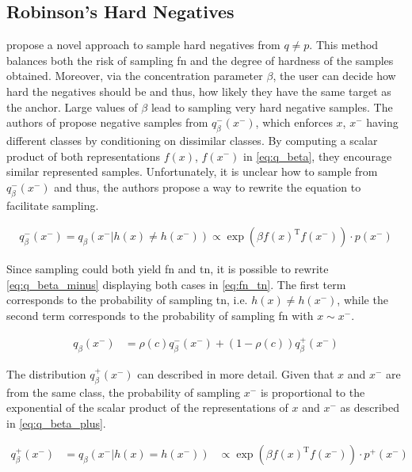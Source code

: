 \subsection{Robinson's Hard Negatives}\label{subsec:robinson_hard_negatives}

\citet{robinson_contrastive_2021} 
propose a novel approach to sample hard negatives from $q \neq p$.
This method balances both the risk of sampling \ac{fn} and the degree of hardness of the samples obtained.
Moreover, via the concentration parameter $\beta$, the user can decide how hard the negatives should be and thus, how likely they have the same target as the anchor.
Large values of $\beta$ lead to sampling very hard negative samples.
The authors of \citet{robinson_contrastive_2021} propose negative samples from $q^-_{\beta}(x^-)$, 
which enforces $x$, $x^-$ having different classes by conditioning on dissimilar classes.
By computing a scalar product of both representations $f(x)$, $f(x^-)$ in \eqref{eq:q_beta}, 
they encourage similar represented samples.
Unfortunately, it is unclear how to sample from $q^-_{\beta}(x^-)$ and thus, 
the authors propose a way to rewrite the equation to facilitate sampling.

\begin{align} 
    q^-_{\beta}(x^-) = q_\beta(x^-|h(x) \neq h(x^-)) \propto \exp(\beta f(x)^\text{T}f(x^-))\cdot p(x^-) 
\label{eq:q_beta}
\end{align} 


Since sampling could both yield \ac{fn} and \ac{tn}, it is possible to rewrite \eqref{eq:q_beta_minus} 
displaying both cases in \eqref{eq:fn_tn}.
The first term corresponds to the probability of sampling \ac{tn}, i.e. $h(x) \neq h(x^-)$,
 while the second term corresponds to the probability of sampling \ac{fn} with $x \sim x^-$.

\begin{align}
    q_\beta(x^-) &= \rho(c)q^{-}_\beta(x^-) + (1-\rho(c))q^{+}_\beta(x^-)
    \label{eq:fn_tn}
\end{align}

The distribution $q^{+}_\beta(x^-)$ can described in more detail.
Given that $x$ and $x^-$ are from the same class, 
the probability of sampling $x^-$ is proportional to the exponential of the scalar product of the 
representations of $x$ and $x^-$ as described in \eqref{eq:q_beta_plus}.

\begin{align}
    q^{+}_\beta(x^-) &= q_\beta(x^-|h(x) = h(x^-)) &\propto \exp(\beta f(x)^\text{T}f(x^-))\cdot p^+(x^-) 
    \label{eq:q_beta_plus}
\end{align}

